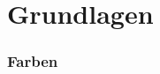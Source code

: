 
\part{Grundlagen}\label{part:grundlagen}

\section{Farben}\label{sec:grundlagen-farben}

\begin{description}
	\item	{}
	\item {}
	\item {}
	\item	{}
	\item {}
\end{description}
